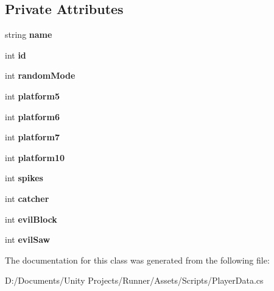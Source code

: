 \subsection*{Private Attributes}
\begin{DoxyCompactItemize}
\item 
\mbox{\label{class_player_data_a5b74be3f2b0098e0eeaa7e2603be0910}} 
string {\bfseries name}
\item 
\mbox{\label{class_player_data_afc72440ab55db3a03e5061e0a8d2f900}} 
int {\bfseries id}
\item 
\mbox{\label{class_player_data_a4d0f8b46357cde8104f2540adc540381}} 
int {\bfseries random\+Mode}
\item 
\mbox{\label{class_player_data_acd8a4d2074df91a2797917e71aadb74e}} 
int {\bfseries platform5}
\item 
\mbox{\label{class_player_data_a10da06865940cf0a85a0483527b11745}} 
int {\bfseries platform6}
\item 
\mbox{\label{class_player_data_a9ce8ad8814b9d327a0c3639129ae5398}} 
int {\bfseries platform7}
\item 
\mbox{\label{class_player_data_ac12c51bc45f089e3894d080fad04d8e0}} 
int {\bfseries platform10}
\item 
\mbox{\label{class_player_data_a50fbb2dd4e8d7b597220a4e7259c81b8}} 
int {\bfseries spikes}
\item 
\mbox{\label{class_player_data_aa3eb8266d54bee5c8009ddee08ff78c7}} 
int {\bfseries catcher}
\item 
\mbox{\label{class_player_data_afe1def71152ae200f153e7d5990650bd}} 
int {\bfseries evil\+Block}
\item 
\mbox{\label{class_player_data_af78380705e442827b7021586f1332318}} 
int {\bfseries evil\+Saw}
\end{DoxyCompactItemize}


The documentation for this class was generated from the following file\+:\begin{DoxyCompactItemize}
\item 
D\+:/\+Documents/\+Unity Projects/\+Runner/\+Assets/\+Scripts/Player\+Data.\+cs\end{DoxyCompactItemize}
